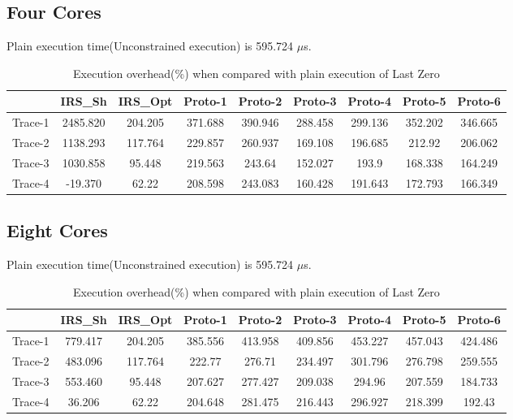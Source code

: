 \subsection{Four Cores}
Plain execution time(Unconstrained execution) is 595.724 $\mu$s.
\begin{table}[h]
\begin{center}
 \begin{tabular}{|c c c c c c c c c|} 
 \hline
 & IRS\_Sh & IRS\_Opt& Proto-1 & Proto-2 & Proto-3 & Proto-4 & Proto-5 & Proto-6\\ %
 \hline
Trace-1 & 2485.820 & 204.205 & 371.688 & 390.946 & 288.458 & 299.136 & 352.202 & 346.665\\
Trace-2 & 1138.293 & 117.764 & 229.857 & 260.937 & 169.108 & 196.685 & 212.92 & 206.062\\
Trace-3 & 1030.858 & 95.448 & 219.563 & 243.64 & 152.027 & 193.9 & 168.338 & 164.249\\
Trace-4 & -19.370 & 62.22 & 208.598 & 243.083 & 160.428 & 191.643 & 172.793 & 166.349\\
\hline
\end{tabular}
\end{center}
\caption{Execution overhead(\%) when compared with plain execution of Last Zero}
\label{last_zero_irs_res_cores_4}
\end{table}

\subsection{Eight Cores}
Plain execution time(Unconstrained execution) is 595.724 $\mu$s.
\begin{table}[h]
\begin{center}
 \begin{tabular}{|c c c c c c c c c|} 
 \hline
 & IRS\_Sh & IRS\_Opt& Proto-1 & Proto-2 & Proto-3 & Proto-4 & Proto-5 & Proto-6\\ %
 \hline
Trace-1 & 779.417 & 204.205 & 385.556 & 413.958 & 409.856 & 453.227 & 457.043 & 424.486\\
Trace-2 & 483.096 & 117.764 & 222.77 & 276.71 & 234.497 & 301.796 & 276.798 & 259.555\\
Trace-3 & 553.460 & 95.448 & 207.627 & 277.427 & 209.038 & 294.96 & 207.559 & 184.733\\
Trace-4 & 36.206 & 62.22 & 204.648 & 281.475 & 216.443 & 296.927 & 218.399 & 192.43\\
\hline
\end{tabular}
\end{center}
\caption{Execution overhead(\%) when compared with plain execution of Last Zero}
\label{last_zero_irs_res_cores_8}
\end{table}

